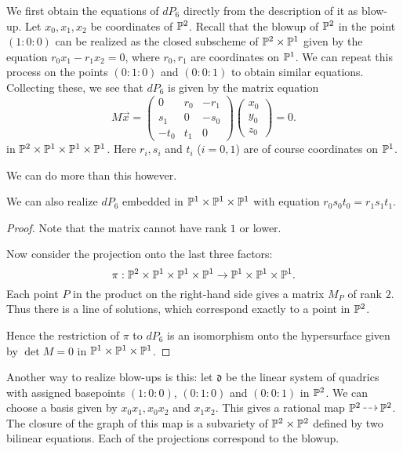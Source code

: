 \documentclass[11pt, english]{book}
\begin{document}
We first obtain the equations of $dP_6$ directly from the description of it as blow-up. Let $x_0,x_1,x_2$ be coordinates of $\mathbb{P}^2$. Recall that the blowup of $\mathbb{P}^2$ in the point $(1:0:0)$ can be realized as the closed subscheme of $\mathbb{P}^2 \times \mathbb{P}^1$ given by the equation $r_0x_1-r_1x_2=0$, where $r_0,r_1$ are coordinates on $\mathbb{P}^1$. We can repeat this process on the points $(0:1:0)$ and $(0:0:1)$ to obtain similar equations. Collecting these, we see that $dP_6$ is given by the matrix equation
\[
M\vec x = 
\begin{pmatrix}
0 & r_0 & -r_1 \\
s_1 & 0 & -s_0 \\
-t_0 & t_1 & 0
\end{pmatrix}
\begin{pmatrix}
x_0 \\ y_0 \\ z_0
\end{pmatrix}= 0.
\]
in $\mathbb{P}^2 \times \mathbb{P}^1 \times \mathbb{P}^1 \times \mathbb{P}^1$. Here $r_i,s_i$ and $t_i$ ($i=0,1$) are of course coordinates on $\mathbb{P}^1$.

We can do more than this however. 

\begin{lemma}
We can also realize $dP_6$ embedded in $\mathbb{P}^1 \times \mathbb{P}^1 \times \mathbb{P}^1$ with equation $r_0s_0t_0=r_1s_1t_1$.
\end{lemma}
\begin{proof}
Note that the matrix cannot have rank $1$ or lower.

Now consider the projection onto the last three factors:
$$
\pi:\mathbb{P}^2 \times \mathbb{P}^1 \times \mathbb{P}^1 \times \mathbb{P}^1 \to \mathbb{P}^1 \times \mathbb{P}^1 \times \mathbb{P}^1.
$$
Each point $P$ in the product on the right-hand side gives a matrix $M_P$ of rank $2$. Thus there is a line of solutions, which correspond exactly to a point in $\mathbb{P}^2$.

Hence the restriction of $\pi$ to $dP_6$ is an isomorphism onto the hypersurface given by $\det M=0$ in $\mathbb{P}^1 \times \mathbb{P}^1 \times \mathbb{P}^1$. 
\end{proof}

Another way to realize blow-ups is this: let $\mathfrak d$ be the linear system of quadrics with assigned basepoints $(1:0:0)$, $(0:1:0)$ and $(0:0:1)$ in $\mathbb{P}^2$. We can choose a basis given by $x_0x_1,x_0x_2$ and $x_1x_2$. This gives a rational map $\PP^2 \rmap \PP^2$. The closure of the graph of this map is a subvariety of $\mathbb{P}^2 \times \mathbb{P}^2$ defined by two bilinear equations. Each of the projections correspond to the blowup.
\end{document}
